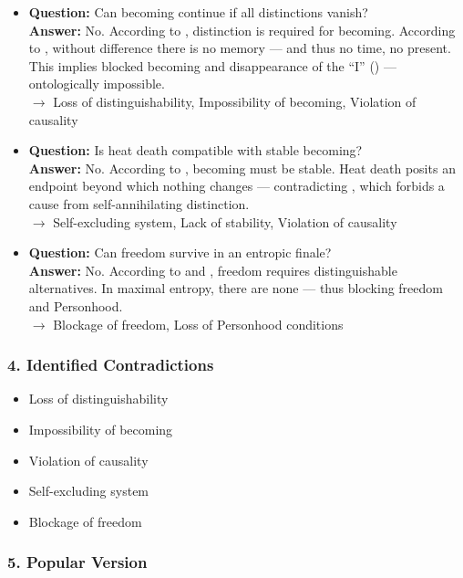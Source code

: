 \documentclass[12pt]{article}
\begin{document}
\begin{itemize}
\item \textbf{Question:} Can becoming continue if all distinctions vanish?\\
\textbf{Answer:} No. According to \text{[9.1]}, distinction is required for becoming. According to \text{[10.3.7]}, without difference there is no memory — and thus no time, no present. This implies blocked becoming and disappearance of the ``I'' (\text{[10.5]}) — ontologically impossible.\\
$\rightarrow$ Loss of distinguishability, Impossibility of becoming, Violation of causality

\item \textbf{Question:} Is heat death compatible with stable becoming?\\
\textbf{Answer:} No. According to \text{[7]}, becoming must be stable. Heat death posits an endpoint beyond which nothing changes — contradicting \text{[6]}, which forbids a cause from self-annihilating distinction.\\
$\rightarrow$ Self-excluding system, Lack of stability, Violation of causality

\item \textbf{Question:} Can freedom survive in an entropic finale?\\
\textbf{Answer:} No. According to \text{[10.6]} and \text{[12.2]}, freedom requires distinguishable alternatives. In maximal entropy, there are none — thus blocking freedom and Personhood.\\
$\rightarrow$ Blockage of freedom, Loss of Personhood conditions
\end{itemize}

\subsubsection*{4. Identified Contradictions}

\begin{itemize}
\item Loss of distinguishability
\item Impossibility of becoming
\item Violation of causality
\item Self-excluding system
\item Blockage of freedom
\end{itemize}

\subsubsection*{5. Popular Version}
\end{document}
